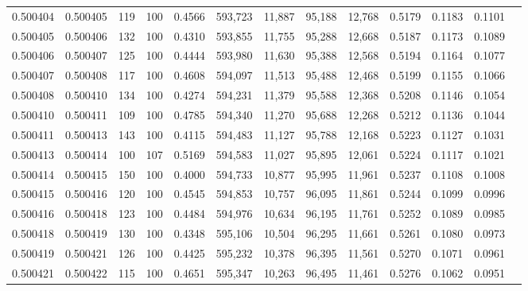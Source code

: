 \begin{tabular}{rrrrrrrrrrrrr}
0.500404 & 0.500405 &   119 & 100 &                                     0.4566 & 593,723 &  11,887 &  95,188 &  12,768 & 0.5179 & 0.1183 & 0.1101 \\
0.500405 & 0.500406 &   132 & 100 &                                     0.4310 & 593,855 &  11,755 &  95,288 &  12,668 & 0.5187 & 0.1173 & 0.1089 \\
0.500406 & 0.500407 &   125 & 100 &                                     0.4444 & 593,980 &  11,630 &  95,388 &  12,568 & 0.5194 & 0.1164 & 0.1077 \\
0.500407 & 0.500408 &   117 & 100 &                                     0.4608 & 594,097 &  11,513 &  95,488 &  12,468 & 0.5199 & 0.1155 & 0.1066 \\
0.500408 & 0.500410 &   134 & 100 &                                     0.4274 & 594,231 &  11,379 &  95,588 &  12,368 & 0.5208 & 0.1146 & 0.1054 \\
0.500410 & 0.500411 &   109 & 100 &                                     0.4785 & 594,340 &  11,270 &  95,688 &  12,268 & 0.5212 & 0.1136 & 0.1044 \\
0.500411 & 0.500413 &   143 & 100 &                                     0.4115 & 594,483 &  11,127 &  95,788 &  12,168 & 0.5223 & 0.1127 & 0.1031 \\
0.500413 & 0.500414 &   100 & 107 &                                     0.5169 & 594,583 &  11,027 &  95,895 &  12,061 & 0.5224 & 0.1117 & 0.1021 \\
0.500414 & 0.500415 &   150 & 100 &                                     0.4000 & 594,733 &  10,877 &  95,995 &  11,961 & 0.5237 & 0.1108 & 0.1008 \\
0.500415 & 0.500416 &   120 & 100 &                                     0.4545 & 594,853 &  10,757 &  96,095 &  11,861 & 0.5244 & 0.1099 & 0.0996 \\
0.500416 & 0.500418 &   123 & 100 &                                     0.4484 & 594,976 &  10,634 &  96,195 &  11,761 & 0.5252 & 0.1089 & 0.0985 \\
0.500418 & 0.500419 &   130 & 100 &                                     0.4348 & 595,106 &  10,504 &  96,295 &  11,661 & 0.5261 & 0.1080 & 0.0973 \\
0.500419 & 0.500421 &   126 & 100 &                                     0.4425 & 595,232 &  10,378 &  96,395 &  11,561 & 0.5270 & 0.1071 & 0.0961 \\
0.500421 & 0.500422 &   115 & 100 &                                     0.4651 & 595,347 &  10,263 &  96,495 &  11,461 & 0.5276 & 0.1062 & 0.0951 \\

\end{tabular}

